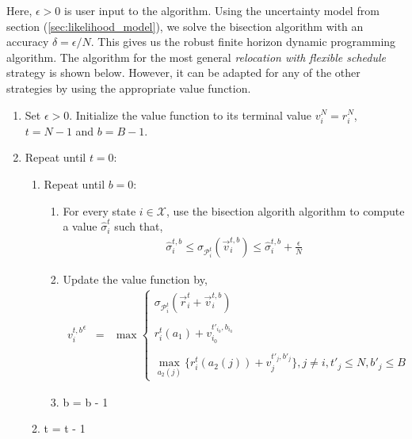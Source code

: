 Here, $\epsilon > 0$ is user input to the algorithm. Using the uncertainty model from section (\ref{sec:likelihood_model}), we solve the bisection algorithm with an accuracy $\delta = \epsilon / N$. This gives us the robust finite horizon dynamic programming algorithm. The algorithm for the most general \textit{relocation with flexible schedule} strategy is shown below. However, it can be adapted for any of the other strategies by using the appropriate value function.

\begin{enumerate}
	\item Set $\epsilon > 0$. Initialize the value function to its terminal value $v_i^N = r_i^N$, $t=N-1$ and $b=B-1$. \\
	\item Repeat until $t=0$: \\
		\begin{enumerate}
			\item Repeat until $b=0$: \\	
		\begin{enumerate}
			\item For every state $i \in \mathcal{X}$, use the bisection algorith algorithm to compute a value $\hat{\sigma}_i^t$ such that,
			\begin{eqnarray*}
				\hat{\sigma}_i^{t,b} \leq \sigma_{\mathcal{P}_i^t}(\vec{v}_i^{t,b}) \leq \hat{\sigma}_i^{t,b} + \frac{\epsilon}{N}
			\end{eqnarray*}
			\item Update the value function by,
			\begin{eqnarray*}
			{v_{i}^{t,b}}^\epsilon &=& \max
    			\begin{cases}
    			\sigma_{\mathcal{P}_{i}^{t}}(\vec{r}_{i}^{t} + \vec{v}_{i}^{t,b})\\ \\
    			r_{i}^{t}(a_1) + v_{i_0}^{t'_{i_0},b_{i_0}} \\ \\
    			\max_{a_2(j)} \bigg\{r_{i}^{t}(a_2(j)) + v_{j}^{t'_{j},b'_{j}}\bigg\}, j \neq i, t'_{j} \leq N, b'_{j} \leq B
    			\end{cases}
			\end{eqnarray*}
			\item b = b - 1 \\
		\end{enumerate}
		\item t = t - 1 \\
		\end{enumerate}

\end{enumerate}

